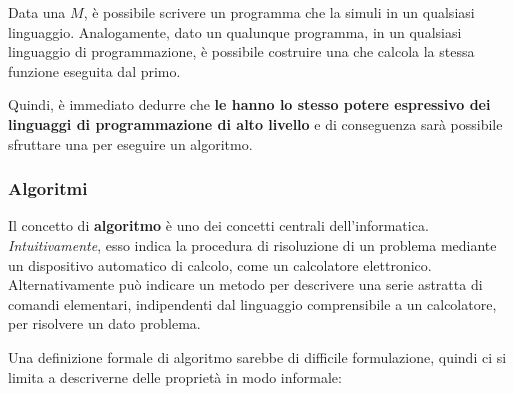 \documentclass[italian, 10pt]{article}
\begin{document}
Data una \TM \(M\), è possibile scrivere un programma che la simuli in un qualsiasi linguaggio.
Analogamente, dato un qualunque programma, in un qualsiasi linguaggio di programmazione, è possibile costruire una \TM che calcola la stessa funzione eseguita dal primo.

Quindi, è immediato dedurre che \textbf{le \TM hanno lo stesso potere espressivo dei linguaggi di programmazione di alto livello} e di conseguenza sarà possibile sfruttare una \TM per eseguire un algoritmo.

\subsubsection{Algoritmi}
\label{sec:algoritmi}

Il concetto di \textbf{algoritmo} è uno dei concetti centrali dell'informatica.
\textit{Intuitivamente}, esso indica la procedura di risoluzione di un problema mediante un dispositivo automatico di calcolo, come un calcolatore elettronico.
Alternativamente può indicare un metodo per descrivere una serie astratta di comandi elementari, indipendenti dal linguaggio comprensibile a un calcolatore, per risolvere un dato problema.

Una definizione formale di algoritmo sarebbe di difficile formulazione, quindi ci si limita a descriverne delle proprietà in modo informale:
\end{document}
